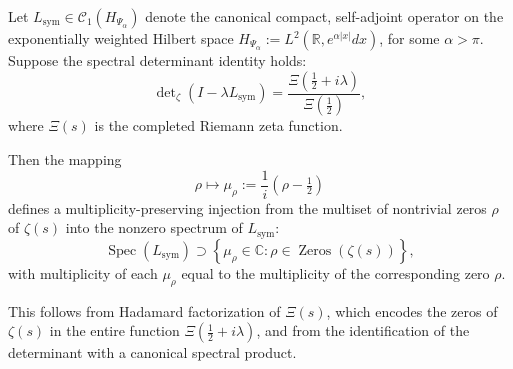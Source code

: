 \begin{lemma}
\label{lem:spectral-encoding-injection}
Let \( L_{\mathrm{sym}} \in \mathcal{C}_1(H_{\Psi_\alpha}) \) denote the canonical compact, self-adjoint operator on the exponentially weighted Hilbert space \( H_{\Psi_\alpha} := L^2(\mathbb{R}, e^{\alpha |x|} dx) \), for some \( \alpha > \pi \). Suppose the spectral determinant identity holds:
\[
\det\nolimits_{\zeta}(I - \lambda L_{\mathrm{sym}}) = \frac{\Xi\left( \tfrac{1}{2} + i\lambda \right)}{\Xi\left( \tfrac{1}{2} \right)},
\]
where \( \Xi(s) \) is the completed Riemann zeta function.

Then the mapping
\[
\rho \mapsto \mu_\rho := \frac{1}{i}(\rho - \tfrac{1}{2})
\]
defines a multiplicity-preserving injection from the multiset of nontrivial zeros \( \rho \) of \( \zeta(s) \) into the nonzero spectrum of \( L_{\mathrm{sym}} \):
\[
\operatorname{Spec}(L_{\mathrm{sym}}) \supset \left\{ \mu_\rho \in \mathbb{C} : \rho \in \operatorname{Zeros}(\zeta(s)) \right\},
\]
with multiplicity of each \( \mu_\rho \) equal to the multiplicity of the corresponding zero \( \rho \).

\medskip
\noindent
This follows from Hadamard factorization of \( \Xi(s) \), which encodes the zeros of \( \zeta(s) \) in the entire function \( \Xi(\tfrac{1}{2} + i\lambda) \), and from the identification of the determinant with a canonical spectral product.
\end{lemma}
